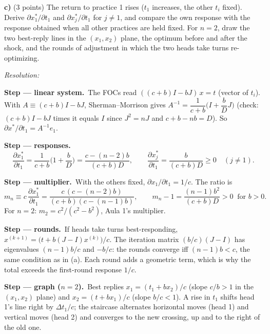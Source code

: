 \documentclass[11pt,a4paper]{article}
\newif\ifsolucoes
\newcommand{\espacoresol}{5cm}   %
\newcommand{\resolespaco}{\ifsolucoes\else\par\textit{Resolution:}\vspace{\espacoresol}\par\fi}
\newcommand{\passo}[2]{\par\smallskip\noindent\textbf{Step --- #1.}~#2}
\begin{document}
\textbf{c)} (3 points) The return to practice 1 rises ($t_1$ increases, the other $t_i$ fixed).
Derive $\partial x_1^*/\partial t_1$ and $\partial x_j^*/\partial t_1$ for $j\ne1$, and compare
the own response with the response obtained when all other practices are held fixed. For
$n=2$, draw the two best-reply lines in the $(x_1,x_2)$ plane, the optimum before and after the
shock, and the rounds of adjustment in which the two heads take turns re-optimizing.
\resolespaco
\begin{sol}
\passo{linear system}{The FOCs read $((c+b)I-bJ)\,x=t$ (vector of $t_i$). With
$A\equiv(c+b)I-bJ$, Sherman--Morrison gives
$A^{-1}=\dfrac1{c+b}\Big(I+\dfrac{b}{D}J\Big)$ (check: $(c+b)I-bJ$ times it equals $I$ since
$J^2=nJ$ and $c+b-nb=D$). So $\partial x^*/\partial t_1=A^{-1}e_1$.}
\passo{responses}{$$\frac{\partial x_1^*}{\partial t_1}=\frac{1}{c+b}\Big(1+\frac bD\Big)=\frac{c-(n-2)b}{(c+b)D},\qquad
\frac{\partial x_j^*}{\partial t_1}=\frac{b}{(c+b)D}\ge0\quad(j\ne1).$$}
\passo{multiplier}{With the others fixed, $\partial x_1/\partial t_1=1/c$. The ratio is
$$m_n\equiv c\,\frac{\partial x_1^*}{\partial t_1}=\frac{c\,(c-(n-2)b)}{(c+b)(c-(n-1)b)},\qquad m_n-1=\frac{(n-1)b^2}{(c+b)D}>0\ \text{ for } b>0 .$$
For $n=2$: $m_2=c^2/(c^2-b^2)$, Aula 1's multiplier.}
\passo{rounds}{If heads take turns best-responding,
$x^{(k+1)}=\big(t+b(J-I)x^{(k)}\big)/c$. The iteration matrix $(b/c)(J-I)$ has eigenvalues
$(n-1)b/c$ and $-b/c$: the rounds converge iff $(n-1)b<c$, the same condition as in (a). Each
round adds a geometric term, which is why the total exceeds the first-round response $1/c$.}
\passo{graph ($n=2$)}{Best replies $x_1=(t_1+bx_2)/c$ (slope $c/b>1$ in the $(x_1,x_2)$ plane) and
$x_2=(t+bx_1)/c$ (slope $b/c<1$). A rise in $t_1$ shifts head 1's line right by $\Delta t_1/c$; the
staircase alternates horizontal moves (head 1) and vertical moves (head 2) and converges to the new
crossing, up and to the right of the old one.}
\begin{center}
\end{center}
\end{sol}
\end{document}
